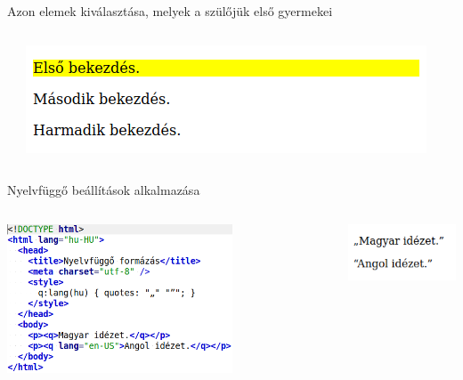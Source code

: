 \begin{frame}
  Azon elemek kiválasztása, melyek a szülőjük első gyermekei
  \begin{columns}[c]
      \begin{exampleblock}{}
        \scriptsize
        
        
      \end{exampleblock}
      \includegraphics[width=\textwidth]{firstchild.png}
  \end{columns}
\end{frame}

\begin{frame}
  Nyelvfüggő beállítások alkalmazása
  \begin{columns}[c]
      \begin{exampleblock}{}
        \includegraphics[width=0.7\textwidth]{langhtml.png}
      \end{exampleblock}
      \includegraphics[width=\textwidth]{lang.png}
  \end{columns}
\end{frame}

